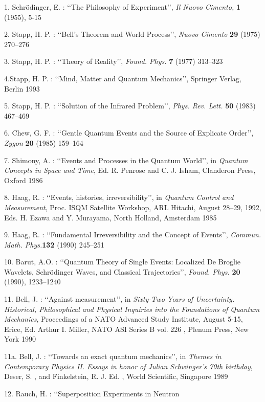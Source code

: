 \documentclass[12pt]{article}
\def\lqq{\lq\lq}
\def\rqq{\rq\rq}
\begin{document}
\begin{description}
\item{1.} Schr\"odinger, E. : \lqq The Philosophy of Experiment\rqq,
{\sl Il Nuovo Cimento, }{\bf 1} (1955), 5-15
\item{2.} Stapp, H. P. : \lqq Bell's Theorem and World Process\rqq,
{\sl Nuovo Cimento} {\bf 29} (1975) 270--276
\item{3.} Stapp, H. P. : \lqq Theory of Reality\rqq, {\sl Found. Phys.}
{\bf 7} (1977) 313--323
\item{4.}Stapp, H. P. : \lqq Mind, Matter and Quantum
Mechanics\rqq, Springer Verlag, Berlin 1993
\item{5.} Stapp, H. P. : \lqq Solution of the Infrared Problem\rqq,
{\sl Phys. Rev. Lett.} {\bf 50} (1983) 467--469
\item{6.}  Chew, G. F. : \lqq Gentle Quantum Events and the Source
of Explicate Order\rqq, {\sl Zygon} {\bf 20} (1985) 159--164
\item{7.} Shimony, A. : \lqq Events and Processes in the Quantum World\rqq,
in
{\sl Quantum Concepts in Space and Time}, Ed. R. Penrose and C. J.
Isham, Clanderon Press, Oxford 1986
\item{8.} Haag, R. : \lqq Events, histories, irreversibility\rqq, in
{\sl Quantum Control and Measurement}, Proc. ISQM Satellite Workshop,
ARL Hitachi, August 28--29, 1992, Eds. H. Ezawa and Y. Murayama,
North Holland, Amsterdam 1985
\item{9.} Haag, R. : \lqq Fundamental Irreversibility and the Concept of
Events\rqq, {\sl Commun. Math. Phys.}{\bf 132} (1990) 245--251
\item{10.}  Barut, A.O. : \lqq Quantum Theory of Single Events: Localized
De Broglie Wavelets, Schr\"odinger Waves, and Classical Trajectories\rqq,
{\sl Found. Phys.} {\bf 20} (1990), 1233--1240
\item{11.}  Bell,  J. : \lqq Against measurement\rqq, in
{\sl Sixty-Two Years of Uncertainty. Historical, Philosophical and
Physical Inquiries into the Foundations of Quantum Mechanics}, Proceedings
of a NATO Advanced Study Institute, August 5-15, Erice, Ed. Arthur I. Miller,
NATO ASI Series B vol. 226 , Plenum Press, New York 1990
\item{11a.} Bell,  J. : \lqq Towards an exact quantum mechanics\rqq,  in
{\sl Themes in Contemporary Physics II.  Essays in honor of Julian
Schwinger's 70th birthday},  Deser,  S. ,  and Finkelstein,  R. J.  Ed. ,
World Scientific,  Singapore 1989
\item{12.} Rauch, H. : \lqq Superposition Experiments in Neutron

\end{description}
\end{document}
